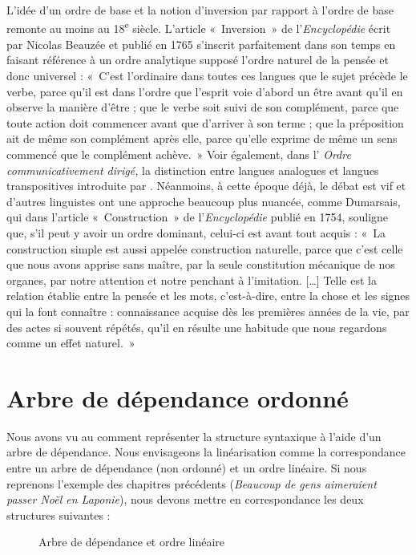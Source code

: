 {    L’idée d’un ordre de base et la notion d’inversion par rapport à l’ordre de base remonte au moins au 18\textsuperscript{e} siècle. L’article «~Inversion~» de l’\textit{Encyclopédie} écrit par Nicolas Beauzée et publié en 1765 s’inscrit parfaitement dans son temps en faisant référence à un ordre analytique supposé l’ordre naturel de la pensée et donc universel : «~C’est l’ordinaire dans toutes ces langues que le sujet précède le verbe, parce qu’il est dans l’ordre que l’esprit voie d’abord un être avant qu’il en observe la manière d’être ; que le verbe soit suivi de son complément, parce que toute action doit commencer avant que d’arriver à son terme ; que la préposition ait de même son complément après elle, parce qu’elle exprime de même un sens commencé que le complément achève.~» Voir également, dans l’ \textit{Ordre communicativement dirigé,} la distinction entre langues analogues et langues transpositives introduite par \citet{Girard1747}. Néanmoins, à cette époque déjà, le débat est vif et d’autres linguistes ont une approche beaucoup plus nuancée, comme Dumarsais, qui dans l’article «~Construction~» de l’\textit{Encyclopédie} publié en 1754, souligne que, s’il peut y avoir un ordre dominant, celui-ci est avant tout acquis : «~La construction simple est aussi appelée construction naturelle, parce que c’est celle que nous avons apprise sans maître, par la seule constitution mécanique de nos organes, par notre attention et notre penchant à l’imitation. […] Telle est la relation établie entre la pensée et les mots, c’est-à-dire, entre la chose et les signes qui la font connaître : connaissance acquise dès les premières années de la vie, par des actes si souvent répétés, qu’il en résulte une habitude que nous regardons comme un effet naturel.~»
}
\section{Arbre de dépendance ordonné}\label{sec:3.5.9}

Nous avons vu au  comment représenter la structure syntaxique à l’aide d’un arbre de dépendance. Nous envisageons la linéarisation comme la correspondance entre un arbre de dépendance (non ordonné) et un ordre linéaire. Si nous reprenons l’exemple des chapitres précédents (\textit{Beaucoup de gens aimeraient passer Noël en Laponie}), nous devons mettre en correspondance les deux structures suivantes :

\begin{figure}

\caption{\label{fig:}Arbre de dépendance et ordre linéaire}

\end{figure}

